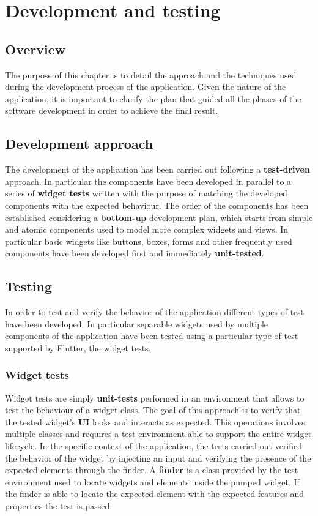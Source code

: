 \documentclass[../../dd.tex]{subfiles}
\begin{document}
	\chapter{Development and testing}
	\section{Overview}
	The purpose of this chapter is to detail the approach and the techniques used during the development process of the application. Given the nature of the application, it is important to clarify the plan that guided all the phases of the software development in order to achieve the final result.

	\section{Development approach}
	The development of the application has been carried out following a \textbf{test-driven} approach. In particular the components have been developed in parallel to a series of
	\textbf{widget tests} written with the purpose of matching the developed components with the expected behaviour. The order of the components has been established considering
	a \textbf{bottom-up} development plan, which starts from simple and atomic components used to model more complex widgets and views. In particular basic widgets like buttons, boxes,
	forms and other frequently used components have been developed first and immediately \textbf{unit-tested}.

	\section{Testing}
	In order to test and verify the behavior of the application different types of test have been developed. In particular separable widgets used by multiple components of the application have been tested using a particular type of test supported by Flutter, the widget tests.

	\subsection{Widget tests}
	Widget tests are simply \textbf{unit-tests} performed in an environment that allows to test the behaviour of a widget class. The goal of this approach is to verify that the tested  widget’s \textbf{UI} looks and interacts as expected. This operations involves multiple classes and requires a test environment able to support the entire widget lifecycle. In the specific context of the application, the tests carried out verified the behavior of the widget by injecting an input and verifying the presence of the expected elements through the finder. A \textbf{finder} is a class provided by the test environment used to locate widgets and elements inside the pumped widget. If the finder is able to locate the expected element with the expected features and properties the test is passed.\\
\end{document}
